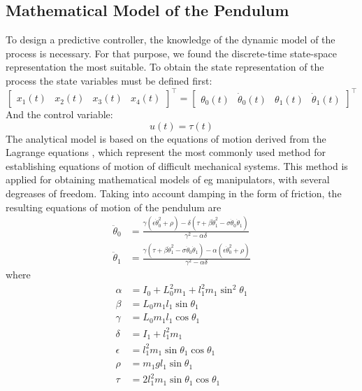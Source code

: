 \subsection{Mathematical Model of the Pendulum}
To design a predictive controller, the knowledge of the dynamic model of the process is necessary. For that purpose, we found the discrete-time state-space representation the most suitable.
To obtain the state representation of the process the state variables must be defined first:
\begin{equation}
\begin{bmatrix}
x_1(t) & x_2(t) & x_3(t) & x_4(t)
\end{bmatrix}^\intercal = 
\begin{bmatrix}
\theta_0(t) & \dot{\theta}_0(t) & \theta_1(t) & \dot{\theta}_1(t)
\end{bmatrix}^\intercal
\end{equation}
And the control variable:
\begin{equation} u(t) = \tau(t) \end{equation}
The analytical model is based on the equations of motion derived from the Lagrange equations \cite{furuta:pendulum}, which represent the most commonly used method for establishing equations of motion of difficult mechanical systems. This method is applied for obtaining mathematical models of eg manipulators, with several degreases of freedom. Taking into account damping in the
form of friction, the resulting equations of motion of the
pendulum are 
\begin{subequations}
	\begin{align}
	\ddot{\theta}_0 &= \frac{\gamma(\epsilon\dot{\theta}_0^2+\rho)-\delta(\tau+\beta\dot{\theta}_1^2-\sigma\dot{\theta}_0\dot{\theta}_1)}{\gamma^2-\alpha\delta}\\
	\ddot{\theta}_1 &= \frac{\gamma(\tau+\beta\dot{\theta}_1^2-\sigma\dot{\theta}_0\dot{\theta}_1)-\alpha(\epsilon\dot{\theta}_0^2+\rho)}{\gamma^2-\alpha\delta}
	\end{align}
\end{subequations}
where
\begin{subequations}
	\begin{align}
	\alpha &= I_0+L_0^2m_1+l_1^2m_1\sin^2\theta_1\\
	\beta &= L_0m_1l_1\sin\theta_1 \\
	\gamma &= L_0m_1l_1\cos\theta_1\\
	\delta &= I_1+l_1^2m_1\\
	\epsilon &= l^2_1m_1\sin\theta_1\cos\theta_1\\
	\rho &= m_1gl_1\sin\theta_1\\
	\tau &= 2l^2_1m_1\sin\theta_1\cos\theta_1
	\end{align}
\end{subequations}
